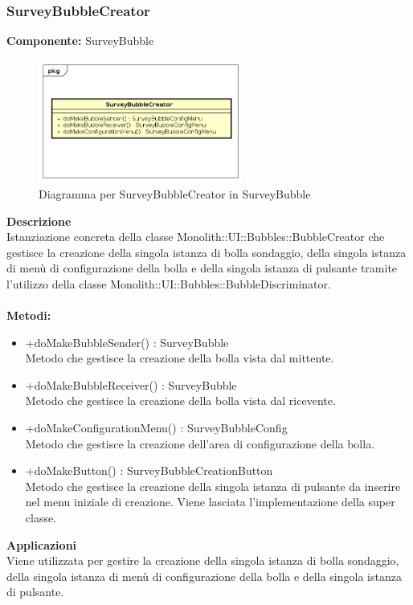 \subsubsection{SurveyBubbleCreator}
\textbf{Componente:}  SurveyBubble\\
   \FloatBarrier
   \begin{figure}[ht]
   \centering
   \includegraphics[width=0.6\textwidth]{img/single-SurveyBubbleCreator}
   \caption{{Diagramma per SurveyBubbleCreator in SurveyBubble}}
\end{figure}
\FloatBarrier
\textbf{Descrizione}\\
Istanziazione concreta della classe Monolith::UI::Bubbles::BubbleCreator che gestisce la creazione della singola istanza di bolla sondaggio, della singola istanza di menù di configurazione della bolla e della singola istanza di pulsante tramite l'utilizzo della classe Monolith::UI::Bubbles::BubbleDiscriminator.
\\
\\
\textbf{Metodi:} 
\begin{itemize}
\item +doMakeBubbleSender() : SurveyBubble 
\\
Metodo che gestisce la creazione della bolla vista dal mittente.
\item +doMakeBubbleReceiver() : SurveyBubble 
\\
Metodo che gestisce la creazione della bolla vista dal ricevente.
\item +doMakeConfigurationMenu() : SurveyBubbleConfig 
\\
Metodo che gestisce la creazione dell'area di configurazione della bolla.
\item +doMakeButton() : SurveyBubbleCreationButton 
\\
Metodo che gestisce la creazione della singola istanza di pulsante da inserire nel menu iniziale di creazione. Viene lasciata l'implementazione della super classe.
\end{itemize} 


\textbf{Applicazioni}\\
Viene utilizzata per gestire la creazione della singola istanza di bolla sondaggio, della singola istanza di menù di configurazione della bolla e della singola istanza di pulsante. 


